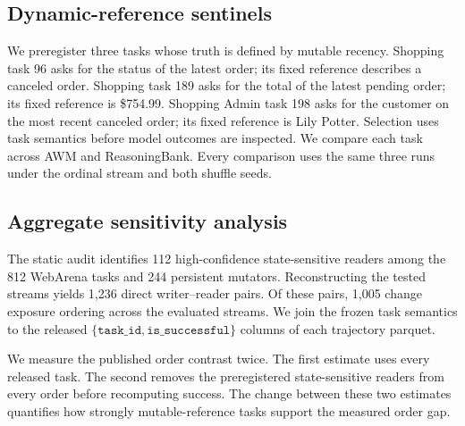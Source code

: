 \subsection{Dynamic-reference sentinels}
We preregister three tasks whose truth is defined by mutable recency. Shopping task 96 asks for the status of the latest order; its fixed reference describes a canceled order. Shopping task 189 asks for the total of the latest pending order; its fixed reference is \$754.99. Shopping Admin task 198 asks for the customer on the most recent canceled order; its fixed reference is Lily Potter. Selection uses task semantics before model outcomes are inspected. We compare each task across AWM and ReasoningBank. Every comparison uses the same three runs under the ordinal stream and both shuffle seeds.

\subsection{Aggregate sensitivity analysis}
The static audit identifies 112 high-confidence state-sensitive readers among the 812 WebArena tasks and 244 persistent mutators. Reconstructing the tested streams yields 1,236 direct writer--reader pairs. Of these pairs, 1,005 change exposure ordering across the evaluated streams. We join the frozen task semantics to the released $\{\texttt{task\_id},\texttt{is\_successful}\}$ columns of each trajectory parquet.

We measure the published order contrast twice. The first estimate uses every released task. The second removes the preregistered state-sensitive readers from every order before recomputing success. The change between these two estimates quantifies how strongly mutable-reference tasks support the measured order gap.
